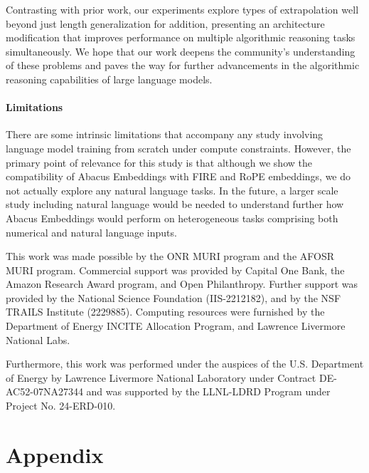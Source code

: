 \documentclass{article}
\begin{document}
Contrasting with prior work, our experiments explore types of extrapolation well beyond just length generalization for addition, presenting an architecture modification that improves performance on multiple algorithmic reasoning tasks simultaneously.
We hope that our work deepens the community's understanding of these problems and paves the way for further advancements in the algorithmic reasoning capabilities of large language models.

\paragraph{Limitations}
There are some intrinsic limitations that accompany any study involving language model training from scratch under compute constraints.
However, the primary point of relevance for this study is that although we show the compatibility of Abacus Embeddings with FIRE and RoPE embeddings, we do not actually explore any natural language tasks.
In the future, a larger scale study including natural language would be needed to understand further how Abacus Embeddings would perform on heterogeneous tasks comprising both numerical and natural language inputs.

\begin{ack}
This work was made possible by the ONR MURI program and the AFOSR MURI program. 
Commercial support was provided by Capital One Bank, the Amazon Research Award program, and Open Philanthropy.
Further support was provided by the National Science Foundation (IIS-2212182), and by the NSF TRAILS Institute (2229885).
Computing resources were furnished by the Department of Energy INCITE Allocation Program, and Lawrence Livermore National Labs. 

Furthermore, this work was performed under the auspices of the U.S. Department of Energy by Lawrence Livermore National Laboratory under Contract DE-AC52-07NA27344 and was supported by the LLNL-LDRD Program under Project No. 24-ERD-010.

\end{ack}
 




\appendix

\section{Appendix}
\end{document}
